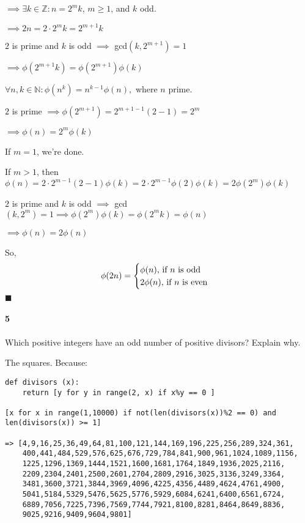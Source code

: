 \documentclass{article}
\begin{document}
$\implies \exists k\in \mathbb{Z}: n = 2^mk$, $m\geq 1$, and $k$ odd.

$\implies 2n = 2\cdot 2^mk = 2^{m+1}k$

$2$ is prime and $k$ is odd $\implies$ gcd$(k, 2^{m+1}) =1$

$\implies \phi(2^{m+1}k) = \phi(2^{m+1})\phi(k)$

$\forall n,k \in \mathbb{N}: \phi(n^k)=
n^{k−1}\phi(n),$ where $n$ prime.

$2$ is prime $\implies \phi(2^{m+1}) = 2^{m + 1-1}(2-1) = 2^m$

$\implies \phi(n) = 2^m\phi(k)$

If $m = 1$, we're done.

If $m > 1$, then $\phi(n) = 2\cdot 2^{m-1}(2-1)\phi(k) = 2
\cdot 2^{m-1}\phi(2)\phi(k) = 2\phi(2^m)\phi(k)$

$2$ is prime and $k$ is odd $\implies$ gcd$(k,2^m) = 1 \implies \phi(2^m)\phi(k) = \phi(2^mk) = \phi(n)$

$\implies \phi(n) = 2\phi(n)$

So,
\[\phi(2n) = \begin{cases}\phi(n)$, if $n$ is odd$\\
                          2\phi(n)$, if $n$ is even$\\\end{cases}\]
\vspace{0.618 em}
$\blacksquare$

\newpage
\paragraph{5} Which positive integers have an odd number of positive
divisors? Explain why.

The squares. Because:

\begin{verbatim}
def divisors (x):
    return [y for y in range(2, x) if x%y == 0 ]

[x for x in range(1,10000) if not(len(divisors(x))%2 == 0) and
len(divisors(x)) >= 1]

=> [4,9,16,25,36,49,64,81,100,121,144,169,196,225,256,289,324,361,
    400,441,484,529,576,625,676,729,784,841,900,961,1024,1089,1156,
    1225,1296,1369,1444,1521,1600,1681,1764,1849,1936,2025,2116,
    2209,2304,2401,2500,2601,2704,2809,2916,3025,3136,3249,3364,
    3481,3600,3721,3844,3969,4096,4225,4356,4489,4624,4761,4900,
    5041,5184,5329,5476,5625,5776,5929,6084,6241,6400,6561,6724,
    6889,7056,7225,7396,7569,7744,7921,8100,8281,8464,8649,8836,
    9025,9216,9409,9604,9801]

\end{verbatim}
\end{document}

